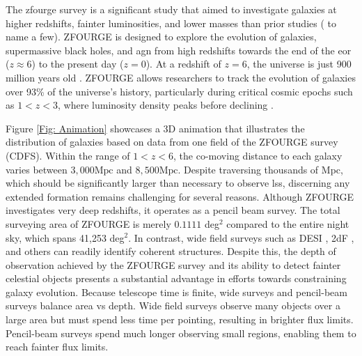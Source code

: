 The \gls{zfourge} survey \citep{straatman_fourstar_2016} is a significant study that aimed to investigate galaxies at higher redshifts, fainter luminosities, and lower masses than prior studies (\citealp{mcgreer_discovery_2006, dai_mid-infrared_2009, casey_redshift_2012, weiss_alma_2013} to name a few). ZFOURGE is designed to explore the evolution of galaxies, supermassive black holes, and \gls{agn} from high redshifts towards the end of the \gls{eor} ($z \approx 6$) to the present day ($z=0$). At a redshift of $z=6$, the universe is just 900 million years old \citep{astropy_collaboration_astropy_2022}. ZFOURGE allows researchers to track the evolution of galaxies over 93\% of the universe's history, particularly during critical cosmic epochs such as $1 < z < 3$, where luminosity density peaks before declining \citep{assef_mid-ir-_2011, gruppioni_modelling_2011, wylezalek_galaxy_2014, madau_cosmic_2014}. 

Figure \ref{Fig: Animation} showcases a 3D animation that illustrates the distribution of galaxies based on data from one field of the ZFOURGE survey (CDFS). Within the range of $1<z<6$, the co-moving distance to each galaxy varies between $3,000 \mathrm{Mpc}$ and $8,500 \mathrm{Mpc}$. Despite traversing thousands of Mpc, which should be significantly larger than necessary to observe \gls{lss}, discerning any extended formation remains challenging for several reasons. Although ZFOURGE investigates very deep redshifts, it operates as a pencil beam survey. The total surveying area of ZFOURGE is merely $0.1111$ deg$^2$ compared to the entire night sky, which spans 41,253 deg$^2$. In contrast, wide field surveys such as DESI \citep{desi_collaboration_desi_2016, desi_collaboration_desi_2024}, 2dF \citep{sadler_radio_2002, beutler_6df_2011}, and others \citep{mcgreer_discovery_2006, stevans_bridging_2018} can readily identify coherent structures. Despite this, the depth of observation achieved by the ZFOURGE survey and its ability to detect fainter celestial objects presents a substantial advantage in efforts towards constraining galaxy evolution. Because telescope time is finite, wide surveys and pencil-beam surveys balance area vs depth. Wide field surveys observe many objects over a large area but must spend less time per pointing, resulting in brighter flux limits. Pencil-beam surveys spend much longer observing small regions, enabling them to reach fainter flux limits.

